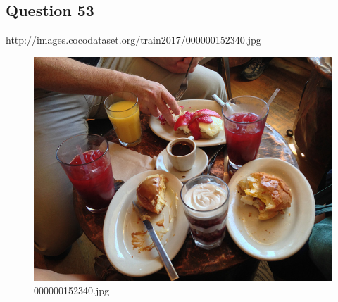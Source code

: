 \subsection*{Question 53}
http://images.cocodataset.org/train2017/000000152340.jpg
\begin{figure}[h]
    \centering
    \includegraphics[width=0.8\linewidth]{../image set/hard/000000152340.jpg}
    \caption{000000152340.jpg}
\end{figure}
